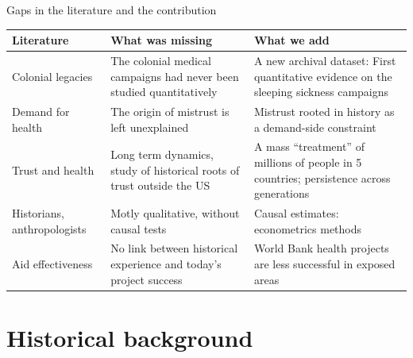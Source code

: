 \documentclass[aspectratio=1610]{beamer}
\begin{document}
\begin{frame}{Gaps in the literature and the contribution}
  \footnotesize
  \renewcommand{\arraystretch}{1.25}
  \begin{tabular}{@{}>{\raggedright\arraybackslash}p{}
                    >{\raggedright\arraybackslash}p{}
                    >{\raggedright\arraybackslash}p{}@{}}
    \toprule
    \textbf{Literature} & \textbf{What was missing} & \textbf{What we add} \\
    \midrule
    Colonial legacies &
      The colonial medical campaigns had never been studied quantitatively &
      A new archival dataset: First quantitative evidence on the sleeping sickness campaigns \\
    Demand for health &
      The origin of mistrust is left unexplained &
      Mistrust rooted in history as a demand-side constraint \\
    Trust and health &
      Long term dynamics, study of historical roots of trust outside the US &
      A mass ``treatment'' of millions of people in 5 countries; persistence across generations \\
    Historians, anthropologists &
      Motly qualitative, without causal tests &
      Causal estimates: econometrics methods \\
    Aid effectiveness &
      No link between historical experience and today's project success &
      World Bank health projects are less successful in exposed areas \\
    \bottomrule
  \end{tabular}
\end{frame}

\section{Historical background}
\end{document}
